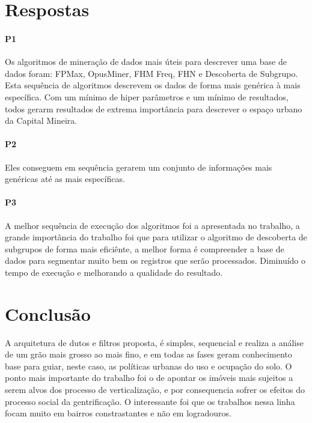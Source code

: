 \documentclass[12pt]{article}
\begin{document}
\section{Respostas}
\paragraph{P1} Os algoritmos de mineração de dados mais úteis para descrever uma base de dados foram: FPMax, OpusMiner, FHM Freq, FHN e Descoberta de Subgrupo. Esta sequência de algoritmos descrevem os dados de forma mais genérica à mais específica. Com um mínimo de hiper parâmetros e um mínimo de resultados, todos gerarm resultados de extrema importância para descrever o espaço urbano da Capital Mineira.
\paragraph{P2} Eles conseguem em sequência gerarem um conjunto de informações mais genéricas até as mais específicas.
\paragraph{P3} A melhor sequência de execução dos algoritmos foi a apresentada no trabalho, a grande importância do trabalho foi que para utilizar o algoritmo de descoberta de subgrupos de forma mais eficiênte, a melhor forma é compreender a base de dados para segmentar muito bem os registros que serão processados. Diminuído o tempo de execução e melhorando a qualidade do resultado.

\section{Conclusão}
A arquitetura de dutos e filtros proposta, é simples, sequencial e realiza a análise de um grão mais grosso ao mais fino, e em todas as fases geram conhecimento base para guiar, neste caso, as políticas urbanas do uso e ocupação do solo. O ponto mais importante do trabalho foi o de apontar os imóveis mais sujeitos a serem alvos dos processo de verticalização, e por consequencia sofrer os efeitos do processo social da gentrificação. O interessante foi que os trabalhos nessa linha focam muito em bairros constrastantes e não em logradouros.


\end{document}
